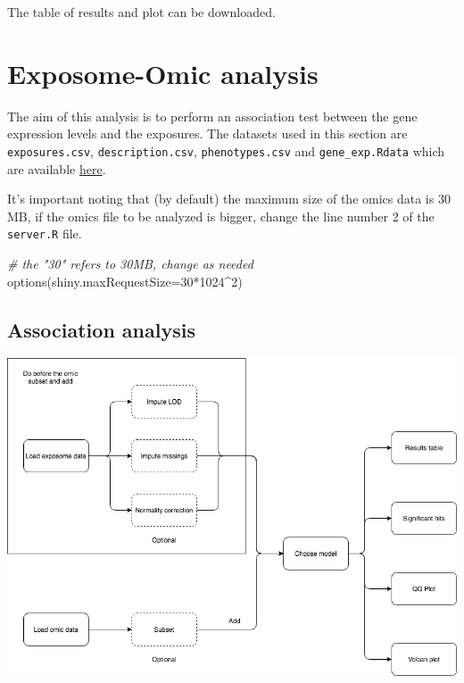 \documentclass[
]{book}
\newenvironment{Shaded}{\begin{snugshade}}{\end{snugshade}}
\newcommand{\AttributeTok}[1]{\textcolor[rgb]{0.77,0.63,0.00}{#1}}
\newcommand{\CommentTok}[1]{\textcolor[rgb]{0.56,0.35,0.01}{\textit{#1}}}
\newcommand{\DecValTok}[1]{\textcolor[rgb]{0.00,0.00,0.81}{#1}}
\newcommand{\FunctionTok}[1]{\textcolor[rgb]{0.00,0.00,0.00}{#1}}
\newcommand{\NormalTok}[1]{#1}
\newcommand{\SpecialCharTok}[1]{\textcolor[rgb]{0.00,0.00,0.00}{#1}}
\begin{document}
The table of results and plot can be downloaded.

\hypertarget{exposome-omic-analysis}{%
\section{Exposome-Omic analysis}\label{exposome-omic-analysis}}

The aim of this analysis is to perform an association test between the gene expression levels and the exposures. The datasets used in this section are \texttt{exposures.csv}, \texttt{description.csv}, \texttt{phenotypes.csv} and \texttt{gene\_exp.Rdata} which are available \href{https://github.com/isglobal-brge/exposomeShiny/tree/master/data}{here}.

It's important noting that (by default) the maximum size of the omics data is 30 MB, if the omics file to be analyzed is bigger, change the line number 2 of the \texttt{server.R} file.

\begin{Shaded}
\begin{Highlighting}[]
  \CommentTok{\# the "30" refers to 30MB, change as needed}
\FunctionTok{options}\NormalTok{(}\AttributeTok{shiny.maxRequestSize=}\DecValTok{30}\SpecialCharTok{*}\DecValTok{1024}\SpecialCharTok{\^{}}\DecValTok{2}\NormalTok{)}
\end{Highlighting}
\end{Shaded}

\hypertarget{association-analysis}{%
\subsection{Association analysis}\label{association-analysis}}

\includegraphics{images/analysis9_1.png}
\end{document}

